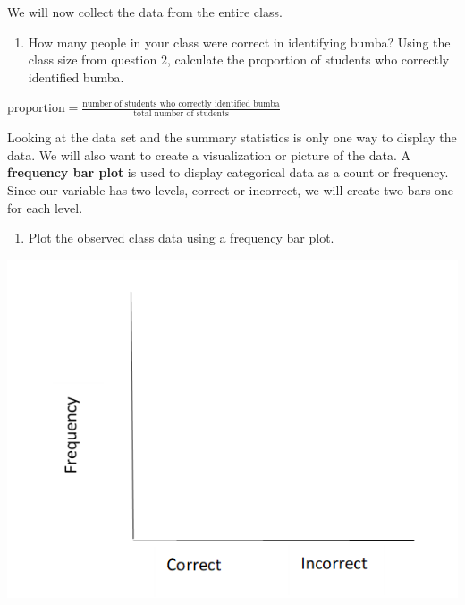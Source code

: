 \documentclass[
]{report}
\providecommand{\tightlist}{%
  \setlength{\itemsep}{0pt}\setlength{\parskip}{0pt}}
\begin{document}
\vspace{0.5in}

We will now collect the data from the entire class.

\begin{enumerate}
\def\labelenumi{\arabic{enumi}.}
\setcounter{enumi}{5}
\tightlist
\item
  How many people in your class were correct in identifying bumba? Using the class size from question 2, calculate the proportion of students who correctly identified bumba.
\end{enumerate}

\begin{center}
$\mbox{proportion} = \frac{\mbox{number of students who correctly identified bumba}}{\mbox{total number of students}}$
\end{center}
\vspace{1in}

Looking at the data set and the summary statistics is only one way to display the data. We will also want to create a visualization or picture of the data. A \textbf{frequency bar plot} is used to display categorical data as a count or frequency. Since our variable has two levels, correct or incorrect, we will create two bars one for each level.

\begin{enumerate}
\def\labelenumi{\arabic{enumi}.}
\setcounter{enumi}{6}
\tightlist
\item
  Plot the observed class data using a frequency bar plot.
\end{enumerate}

\includegraphics{images/barplot_martian.png}
\end{document}
